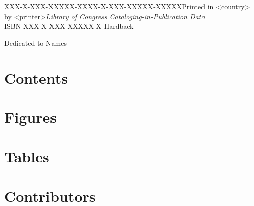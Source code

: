\makehalftitle

\lipsum[5]

 \lipsum[2]


 \lipsum[2]


 \lipsum[2]

\clearemptydoublepage





\makefulltitle




\clearpage


\begin{imprintpage}
{XXX-X-XXX-XXXXX-X}{XXX-X-XXX-XXXXX-X}{XXXX}{Printed in <country> by <printer>}{\textit{Library of Congress Cataloging-in-Publication Data}\\[5pt]ISBN XXX-X-XXX-XXXXX-X Hardback}
\end{imprintpage}

\clearpage

\begin{dedication}
{Dedicated to}
{Names}
\end{dedication}


\setcounter{tocdepth}{2}

\chpmax{99\enspace}
\chapter*{Contents}


%
\chapter*{Figures}

%
%
\chapter*{Tables}


\chapter*{Contributors}

